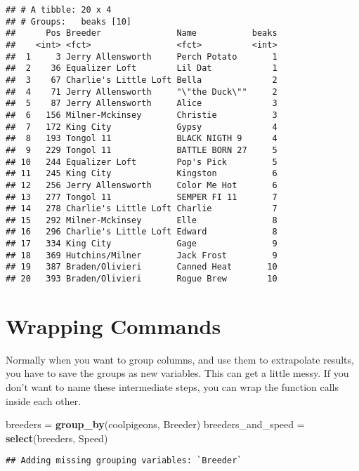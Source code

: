 \documentclass[]{article}
\newenvironment{Shaded}{\begin{snugshade}}{\end{snugshade}}
\newcommand{\KeywordTok}[1]{\textcolor[rgb]{0.13,0.29,0.53}{\textbf{#1}}}
\newcommand{\StringTok}[1]{\textcolor[rgb]{0.31,0.60,0.02}{#1}}
\newcommand{\NormalTok}[1]{#1}
\begin{document}
\begin{verbatim}
## # A tibble: 20 x 4
## # Groups:   beaks [10]
##      Pos Breeder               Name           beaks
##    <int> <fct>                 <fct>          <int>
##  1     3 Jerry Allensworth     Perch Potato       1
##  2    36 Equalizer Loft        Lil Dat            1
##  3    67 Charlie's Little Loft Bella              2
##  4    71 Jerry Allensworth     "\"the Duck\""     2
##  5    87 Jerry Allensworth     Alice              3
##  6   156 Milner-Mckinsey       Christie           3
##  7   172 King City             Gypsy              4
##  8   193 Tongol 11             BLACK NIGTH 9      4
##  9   229 Tongol 11             BATTLE BORN 27     5
## 10   244 Equalizer Loft        Pop's Pick         5
## 11   245 King City             Kingston           6
## 12   256 Jerry Allensworth     Color Me Hot       6
## 13   277 Tongol 11             SEMPER FI 11       7
## 14   278 Charlie's Little Loft Charlie            7
## 15   292 Milner-Mckinsey       Elle               8
## 16   296 Charlie's Little Loft Edward             8
## 17   334 King City             Gage               9
## 18   369 Hutchins/Milner       Jack Frost         9
## 19   387 Braden/Olivieri       Canned Heat       10
## 20   393 Braden/Olivieri       Rogue Brew        10
\end{verbatim}

\section{Wrapping Commands}\label{wrapping-commands}

Normally when you want to group columns, and use them to extrapolate
results, you have to save the groups as new variables. This can get a
little messy. If you don't want to name these intermediate steps, you
can wrap the function calls inside each other.

\begin{Shaded}
\begin{Highlighting}[]
\NormalTok{breeders =}\StringTok{ }\KeywordTok{group_by}\NormalTok{(coolpigeons, Breeder)}
\NormalTok{breeders_and_speed =}\StringTok{ }\KeywordTok{select}\NormalTok{(breeders, Speed)}
\end{Highlighting}
\end{Shaded}

\begin{verbatim}
## Adding missing grouping variables: `Breeder`
\end{verbatim}
\end{document}
